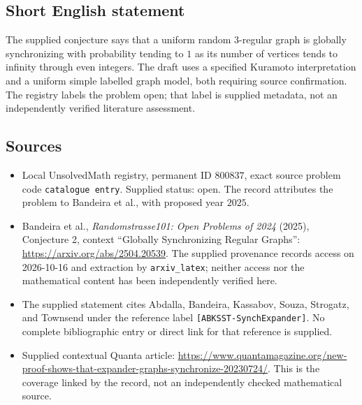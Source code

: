 \documentclass[11pt]{article}
\begin{document}
\subsection{Short English statement}
The supplied conjecture says that a uniform random \(3\)-regular graph is globally synchronizing with probability tending to \(1\) as its number of vertices tends to infinity through even integers. The draft uses a specified Kuramoto interpretation and a uniform simple labelled graph model, both requiring source confirmation. The registry labels the problem open; that label is supplied metadata, not an independently verified literature assessment.
\subsection{Sources}
\begin{itemize}
\item Local UnsolvedMath registry, permanent ID \(800837\), exact source problem code \texttt{catalogue entry}. Supplied status: open. The record attributes the problem to Bandeira et al., with proposed year \(2025\).
\item Bandeira et al., \emph{Randomstrasse101: Open Problems of 2024} (2025), Conjecture 2, context ``Globally Synchronizing Regular Graphs'': \url{https://arxiv.org/abs/2504.20539}. The supplied provenance records access on 2026-10-16 and extraction by \texttt{arxiv\_latex}; neither access nor the mathematical content has been independently verified here.
\item The supplied statement cites Abdalla, Bandeira, Kassabov, Souza, Strogatz, and Townsend under the reference label \texttt{[ABKSST-SynchExpander]}. No complete bibliographic entry or direct link for that reference is supplied.
\item Supplied contextual Quanta article: \url{https://www.quantamagazine.org/new-proof-shows-that-expander-graphs-synchronize-20230724/}. This is the coverage linked by the record, not an independently checked mathematical source.
\end{itemize}
\end{document}
